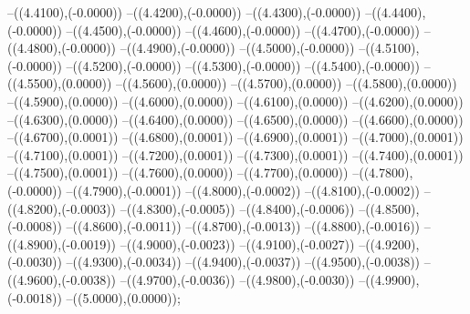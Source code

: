 {	--({\sx*(4.4100)},{\sy*(-0.0000)})
	--({\sx*(4.4200)},{\sy*(-0.0000)})
	--({\sx*(4.4300)},{\sy*(-0.0000)})
	--({\sx*(4.4400)},{\sy*(-0.0000)})
	--({\sx*(4.4500)},{\sy*(-0.0000)})
	--({\sx*(4.4600)},{\sy*(-0.0000)})
	--({\sx*(4.4700)},{\sy*(-0.0000)})
	--({\sx*(4.4800)},{\sy*(-0.0000)})
	--({\sx*(4.4900)},{\sy*(-0.0000)})
	--({\sx*(4.5000)},{\sy*(-0.0000)})
	--({\sx*(4.5100)},{\sy*(-0.0000)})
	--({\sx*(4.5200)},{\sy*(-0.0000)})
	--({\sx*(4.5300)},{\sy*(-0.0000)})
	--({\sx*(4.5400)},{\sy*(-0.0000)})
	--({\sx*(4.5500)},{\sy*(0.0000)})
	--({\sx*(4.5600)},{\sy*(0.0000)})
	--({\sx*(4.5700)},{\sy*(0.0000)})
	--({\sx*(4.5800)},{\sy*(0.0000)})
	--({\sx*(4.5900)},{\sy*(0.0000)})
	--({\sx*(4.6000)},{\sy*(0.0000)})
	--({\sx*(4.6100)},{\sy*(0.0000)})
	--({\sx*(4.6200)},{\sy*(0.0000)})
	--({\sx*(4.6300)},{\sy*(0.0000)})
	--({\sx*(4.6400)},{\sy*(0.0000)})
	--({\sx*(4.6500)},{\sy*(0.0000)})
	--({\sx*(4.6600)},{\sy*(0.0000)})
	--({\sx*(4.6700)},{\sy*(0.0001)})
	--({\sx*(4.6800)},{\sy*(0.0001)})
	--({\sx*(4.6900)},{\sy*(0.0001)})
	--({\sx*(4.7000)},{\sy*(0.0001)})
	--({\sx*(4.7100)},{\sy*(0.0001)})
	--({\sx*(4.7200)},{\sy*(0.0001)})
	--({\sx*(4.7300)},{\sy*(0.0001)})
	--({\sx*(4.7400)},{\sy*(0.0001)})
	--({\sx*(4.7500)},{\sy*(0.0001)})
	--({\sx*(4.7600)},{\sy*(0.0000)})
	--({\sx*(4.7700)},{\sy*(0.0000)})
	--({\sx*(4.7800)},{\sy*(-0.0000)})
	--({\sx*(4.7900)},{\sy*(-0.0001)})
	--({\sx*(4.8000)},{\sy*(-0.0002)})
	--({\sx*(4.8100)},{\sy*(-0.0002)})
	--({\sx*(4.8200)},{\sy*(-0.0003)})
	--({\sx*(4.8300)},{\sy*(-0.0005)})
	--({\sx*(4.8400)},{\sy*(-0.0006)})
	--({\sx*(4.8500)},{\sy*(-0.0008)})
	--({\sx*(4.8600)},{\sy*(-0.0011)})
	--({\sx*(4.8700)},{\sy*(-0.0013)})
	--({\sx*(4.8800)},{\sy*(-0.0016)})
	--({\sx*(4.8900)},{\sy*(-0.0019)})
	--({\sx*(4.9000)},{\sy*(-0.0023)})
	--({\sx*(4.9100)},{\sy*(-0.0027)})
	--({\sx*(4.9200)},{\sy*(-0.0030)})
	--({\sx*(4.9300)},{\sy*(-0.0034)})
	--({\sx*(4.9400)},{\sy*(-0.0037)})
	--({\sx*(4.9500)},{\sy*(-0.0038)})
	--({\sx*(4.9600)},{\sy*(-0.0038)})
	--({\sx*(4.9700)},{\sy*(-0.0036)})
	--({\sx*(4.9800)},{\sy*(-0.0030)})
	--({\sx*(4.9900)},{\sy*(-0.0018)})
	--({\sx*(5.0000)},{\sy*(0.0000)});
}
